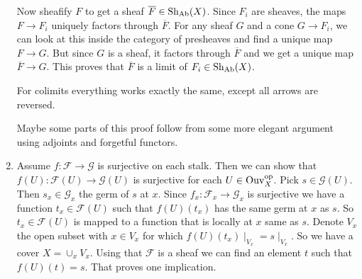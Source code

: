 \begin{exercise}{3}
\begin{enumerate}
{            Now sheafify $F$ to get a sheaf $\overline{F} \in
            \operatorname{Sh}_{\text{Ab}}(X)$. Since $F_i$ are sheaves, the maps $F
            \rightarrow F_i$ uniquely factors through $\overline{F}$. For any
            sheaf $G$ and a cone $G \rightarrow F_i$, we can look at this inside
            the category of presheaves and find a unique map $F \rightarrow G$.
            But since $G$ is a sheaf, it factors through $\overline{F}$ and we
            get a unique map $\overline{F} \rightarrow G$. This proves that
            $\overline{F}$ is a limit of $F_i \in \operatorname{Sh}_{\text{Ab}}(X)$.

            For colimits everything works exactly the same, except all arrows
            are reversed.

            Maybe some parts of this proof follow from some more elegant
            argument using adjoints and forgetful functors.
            }

        \item{Assume $f \colon \mathcal{F} \rightarrow \mathcal{G}$ is
            surjective on each stalk. Then we can show that $f(U) \colon
            \mathcal{F}(U) \rightarrow \mathcal{G}(U)$ is surjective for each $U
            \in \operatorname{Ouv}^{\text{op}}_X$. Pick $s \in \mathcal{G}(U)$. Then $s_x \in
            \mathcal{G}_x$ the germ of $s$ at $x$. Since $f_x \colon
            \mathcal{F}_x \rightarrow \mathcal{G}_x$ is surjective we have a
            function $t_x \in \mathcal{F}(U)$ such that $f(U)(t_x)$ has the same
            germ at $x$ as $s$. So $t_x \in \mathcal{F}(U)$ is mapped to a
            function that is locally at $x$ same as $s$. Denote $V_x$ the open
            subset with $x \in V_x$ for which $f(U)(t_x) \mid_{V_x} = s
            \mid_{V_x}$. So we have a cover $X = \cup_x V_x$. Using that
            $\mathcal{F}$ is a sheaf we can find an element $t$ such that
            $f(U)(t) = s$. That proves one implication.

}
\end{enumerate}
\end{exercise}
